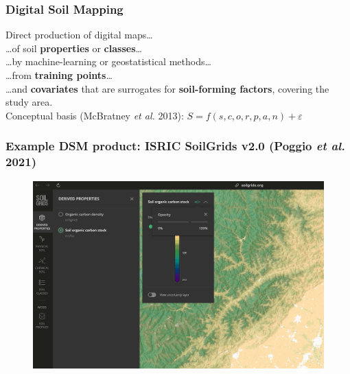 \documentclass[aspectratio=169, 10pt]{beamer}
\begin{document}
\begin{frame}
\frametitle{Digital Soil Mapping}

Direct production of digital maps\ldots\\
\ldots of soil \textbf{properties} or \textbf{classes}\ldots\\
\ldots by machine-learning or geostatistical methods\ldots\\
\ldots from \textbf{training points}\ldots\\
\ldots and \textbf{covariates} that are surrogates for \textbf{soil-forming factors}, covering the study area.
\\[2ex]
Conceptual basis (McBratney \textit{et al.} 2013): $S = f(s, c, o, r, p, a, n) + \varepsilon$ 
\end{frame}



\begin{frame}
  \frametitle{Example DSM product: ISRIC SoilGrids v2.0 (Poggio \emph{et al.} 2021)}
\begin{figure}
    \centering
\includegraphics[height=0.75\textheight]{./graphics_david/SoilGrids_SOCstock_Chengdu.png}
\end{figure}
\end{frame}

\end{document}
